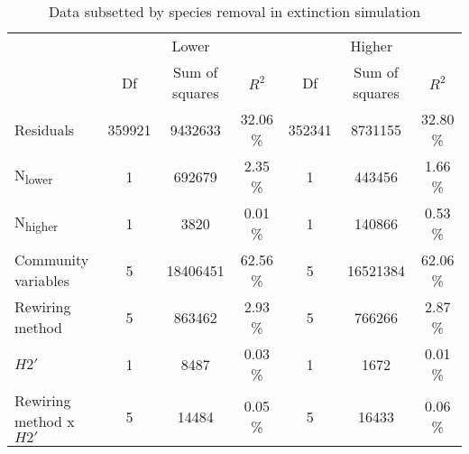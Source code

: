 \documentclass[12pt,a4paper]{article}
\begin{document}
\begin{table}[H]
\begin{subtable}{\linewidth}
\caption{Data subsetted by species removal in extinction simulation}
\label{tab:anova_lo_hi}
\begin{tabularx}{\linewidth}{@{} X *6{c} @{}}
\toprule
  & \multicolumn{3}{c}{Lower} & \multicolumn{3}{c}{Higher} \\ \cmidrule(l){2-4} \cmidrule(l){5-7} 
  						& Df 	& Sum of squares	& $R^2$ 		& Df 	& Sum of squares 	& $R^2$  \\ \midrule
Residuals 				& 359921 & 9432633 		& 32.06 \% 	& 352341	& 8731155 			& 32.80 \%\\ 
N\textsubscript{lower} 	& 1 		& 692679 		& 2.35 \% 	& 1 		& 443456 			& 1.66 \%\\
N\textsubscript{higher} 	& 1 		& 3820 			& 0.01 \% 	& 1 		& 140866 			& 0.53 \%\\
Community variables 		& 5 		& 18406451 		& 62.56 \% 	& 5 		& 16521384 			& 62.06 \%\\
Rewiring method 			& 5 		& 863462			& 2.93 \% 	& 5 		& 766266				& 2.87 \%\\ 
$H2'$ 					& 1 		& 8487 			& 0.03 \% 	& 1 		& 1672 				& 0.01 \%\\
Rewiring method x $H2'$ 	& 5 		& 14484 			& 0.05 \% 	& 5 		& 16433				& 0.06 \%\\ \bottomrule
\end{tabularx}
\end{subtable}
\medskip
\end{table}
\end{document}
